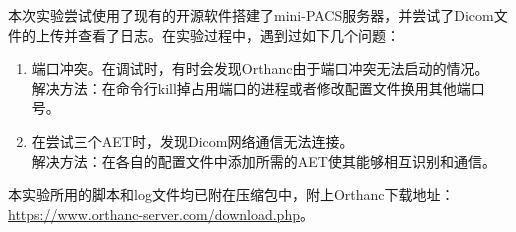 \documentclass[UTF8]{ctexart}
\begin{document}
本次实验尝试使用了现有的开源软件搭建了mini-PACS服务器，并尝试了Dicom文件的上传并查看了日志。在实验过程中，遇到过如下几个问题：
\begin{enumerate}
    \item 端口冲突。在调试时，有时会发现Orthanc由于端口冲突无法启动的情况。\\解决方法：在命令行kill掉占用端口的进程或者修改配置文件换用其他端口号。
    \item 在尝试三个AET时，发现Dicom网络通信无法连接。\\ 解决方法：在各自的配置文件中添加所需的AET使其能够相互识别和通信。
\end{enumerate}

本实验所用的脚本和log文件均已附在压缩包中，附上Orthanc下载地址：\url{https://www.orthanc-server.com/download.php}。


\end{document}
